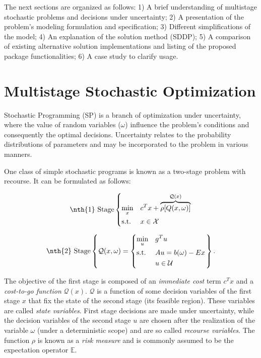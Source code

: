\documentclass{juliacon}
\begin{document}
The next sections are organized as follows: 1) A brief understanding of multistage stochastic problems and decisions under uncertainty; 2) A presentation of the problem's modeling formulation and specification; 3) Different simplifications of the model; 4) An explanation of the solution method (SDDP); 5) A comparison of existing alternative solution implementations and listing of the proposed package functionalities; 6) A case study to clarify usage.

\section{Multistage Stochastic Optimization}
\label{sec:multistochopt}

Stochastic Programming (SP) is a branch of optimization under uncertainty, where the value of random variables ($\omega$) influence the problem's conditions and consequently the optimal decisions. Uncertainty relates to the probability distributions of parameters and may be incorporated to the problem in various manners. 

One class of simple stochastic programs is known as a two-stage problem with recourse. It can be formulated as follows:

\begin{equation*}
\nth{1} \text{ Stage} \left\{
\begin{aligned}
& \underset{x}{\text{min}}
& & c^T x + \overbrace{\rho[Q(x, \omega)]}^{\mathcal{Q}(x)} \\
& \text{s.t.}
& & x \in \mathcal{X}
\end{aligned}
\right.
\end{equation*}

\begin{equation*}
\nth{2} \text{ Stage} \left\{
\mathcal{Q}(x, \omega) = \left\{
\begin{aligned}
& \underset{u}{\text{min}}
& & g^T u \\
& \text{s.t.}
& & A u = b(\omega)- E x \\
& & & u \in \mathcal{U} 
\end{aligned}
\right. \right\}.
\end{equation*}

The objective of the first stage is composed of an \textit{immediate cost} term $c^T x$ and a \textit{cost-to-go function} $\mathcal{Q}(x)$. $\mathcal{Q}$ is a function of some decision variables of the first stage $x$ that fix the state of the second stage (its feasible region). These variables are called \textit{state variables}. First stage decisions are made under uncertainty, while the decision variables of the second stage $u$ are chosen after the realization of the variable $\omega$ (under a deterministic scope) and are so called \textit{recourse variables}. The function $\rho$ is known as a \textit{risk measure} \cite{artzner1999coherent} and is commonly assumed to be the expectation operator $\mathbb{E}$.
\end{document}
